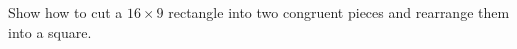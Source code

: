 Show how to cut a $16\times9$ rectangle into two congruent pieces and rearrange them into a square.
